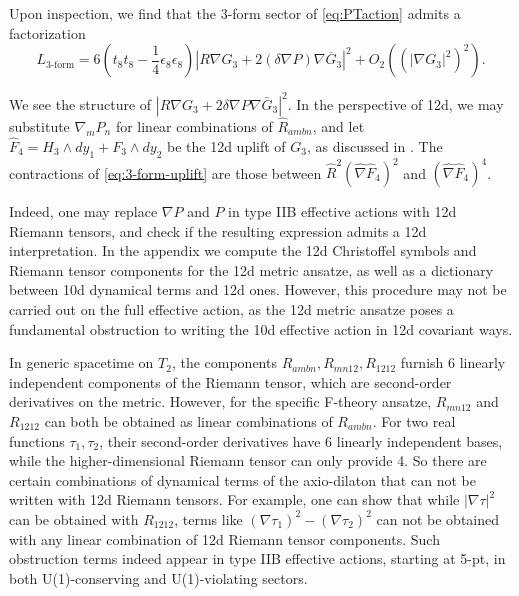 Upon inspection, we find that the 3-form sector of \eqref{eq:PTaction} admits a factorization
\begin{equation}
L_{\text{3-form}} = 
6(t_8t_8 - \frac{1}{4}\epsilon_8\epsilon_8)
|R \nabla G_3 + 2 (\delta \nabla P) \nabla \overline{G}_3|^2
+ O_2((|\nabla G_3|^2)^2).
\label{eq:3-form-uplift}
\end{equation}

We see the structure of $|R \nabla G_3 + 2 \delta \nabla P \nabla \bar{G}_3|^2$.
In the perspective of 12d, we may substitute $\nabla_m P_n$ for linear combinations of $\hat{R}_{ambn}$, and let $\hat{F}_4 = H_3 \wedge dy_1 + F_3 \wedge dy_2$ be the 12d uplift of $G_3$, as discussed in \cite{Cheng:2025efp}.
The contractions of \eqref{eq:3-form-uplift} are those between $\hat{R}^2 (\hat{\nabla} \hat{F}_4)^2$ and $(\hat{\nabla} \hat{F}_4)^4$.

Indeed, one may replace $\nabla P$ and $P$ in type IIB effective actions with 12d Riemann tensors, and check if the resulting expression admits a 12d interpretation.
In the appendix we compute the 12d Christoffel symbols and Riemann tensor components for the 12d metric ansatze, as well as a dictionary between 10d dynamical terms and 12d ones.
However, this procedure may not be carried out on the full effective action, as the 12d metric ansatze poses a fundamental obstruction to writing the 10d effective action in 12d covariant ways.

In generic spacetime on $T_2$, the components $R_{ambn}, R_{mn12}, R_{1212}$ furnish 6 linearly independent components of the Riemann tensor, which are second-order derivatives on the metric.
However, for the specific F-theory ansatze, $R_{mn12}$ and $R_{1212}$ can both be obtained as linear combinations of $R_{ambn}$. For two real functions $\tau_1, \tau_2$, their second-order derivatives have 6 linearly independent bases, while the higher-dimensional Riemann tensor can only provide 4. So there are certain combinations of dynamical terms of the axio-dilaton that can not be written with 12d Riemann tensors.
For example, one can show that while $|\nabla \tau|^2$ can be obtained with $R_{1212}$, terms like $(\nabla \tau_1)^2 - (\nabla \tau_2)^2$ can not be obtained with any linear combination of 12d Riemann tensor components.
Such obstruction terms indeed appear in type IIB effective actions, starting at 5-pt, in both U(1)-conserving and U(1)-violating sectors.

